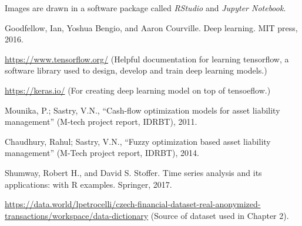 \begin{thebibliography}{1}
		 Images are drawn in a software package called \emph{RStudio} and \emph{Jupyter Notebook}.		 
		 
		 Goodfellow, Ian, Yoshua Bengio, and Aaron Courville. Deep learning. MIT press, 2016.
		 
		 \url{https://www.tensorflow.org/} (Helpful documentation for learning tensorflow, a software library used to design, develop and train deep learning models.)
		 
		 \url{https://keras.io/} (For creating deep learning model on top of tensoeflow.)
		 
		 Mounika, P.; Sastry, V.N., “Cash-flow optimization models for asset liability management” (M-tech project report, IDRBT), 2011.

		 
		 Chaudhury, Rahul; Sastry, V.N., “Fuzzy optimization based asset liability management” (M-Tech project report, IDRBT), 2014.

		 
		 Shumway, Robert H., and David S. Stoffer. Time series analysis and its applications: with R examples. Springer, 2017.	
		 
		 \url{https://data.world/lpetrocelli/czech-financial-dataset-real-anonymized-transactions/workspace/data-dictionary} (Source of dataset used in Chapter 2).
		 
		
		

		
		 
		
\end{thebibliography}
